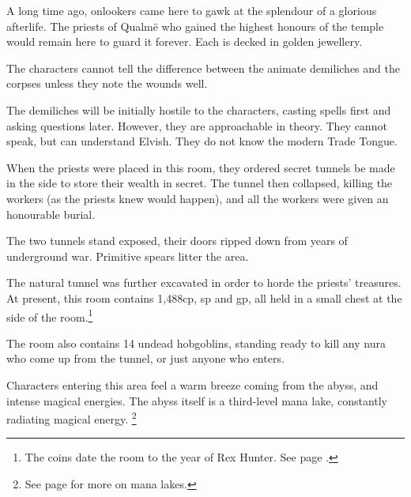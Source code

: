 \begin{multicols}{2}
\begin{exampletext}
A long time ago, onlookers came here to gawk at the splendour of a glorious afterlife.  The priests of Qualm\"{e} who gained the highest honours of the temple would remain here to guard it forever.  Each is decked in golden jewellery.

\end{exampletext}


The characters cannot tell the difference between the animate demiliches and the corpses unless they note the wounds well.

The demiliches will be initially hostile to the characters, casting spells first and asking questions later.
However, they are approachable in theory.
They cannot speak, but can understand Elvish.
They do not know the modern Trade Tongue.


\begin{exampletext}

When the priests were placed in this room, they ordered secret tunnels be made in the side to store their wealth in secret.
The tunnel then collapsed, killing the workers (as the priests knew would happen), and all the workers were given an honourable burial.

\end{exampletext}

The two tunnels stand exposed, their doors ripped down from years of underground war.  Primitive spears litter the area.


The natural tunnel was further excavated in order to horde the priests' treasures.
At present, this room contains 1,488cp, \thepage sp and  gp, all held in a small chest at the side of the room.\footnote{The coins date the room to the year of Rex Hunter.
See page \pageref{r_hunter}.}

The room also contains 14 undead hobgoblins, standing ready to kill any nura who come up from the tunnel, or just anyone who enters.



Characters entering this area feel a warm breeze coming from the abyss, and intense magical energies.
The abyss itself is a third-level mana lake, constantly radiating magical energy.%
\footnote{See page \pageref{mana_lake} for more on mana lakes.}


\end{multicols}
